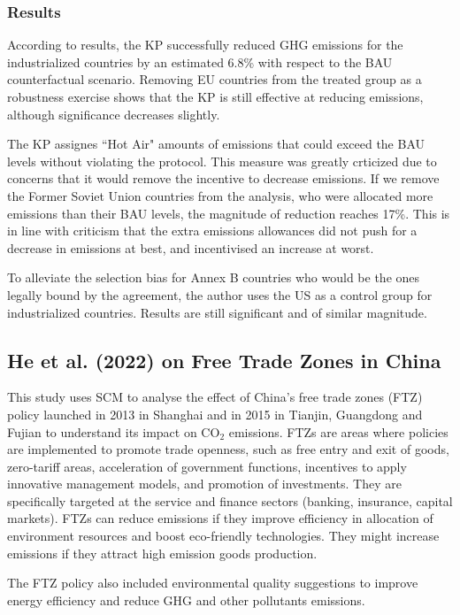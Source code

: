 \documentclass[12pt,a4paper,draft]{article}
\begin{document}
\subsubsection{Results}
According to results, the KP successfully reduced GHG emissions for the industrialized countries by 
an estimated 6.8\% with respect to the BAU counterfactual scenario. Removing EU countries from the 
treated group as a robustness exercise shows that the KP is still effective at reducing emissions, 
although significance decreases slightly.

The KP assignes ``Hot Air" amounts of emissions that could exceed the BAU levels without violating 
the protocol. This measure was greatly crticized due to concerns that it would remove the incentive 
to decrease emissions. If we remove the Former Soviet Union countries from the analysis, who were 
allocated more emissions than their BAU levels, the magnitude of reduction reaches 17\%. This is in 
line with criticism that the extra emissions allowances did not push for a decrease in emissions at 
best, and incentivised an increase at worst. 

To alleviate the selection bias for Annex B countries who would be the ones legally bound by the 
agreement, the author uses the US as a control group for industrialized countries. Results are still 
significant and of similar magnitude.


\subsection{He et al. (2022) on Free Trade Zones in China}
This study uses SCM to analyse the effect of China's free trade zones (FTZ) policy 
launched in 2013 in Shanghai and in 2015 in Tianjin, Guangdong and Fujian to 
understand its impact on CO$_2$ emissions. 
FTZs are areas where policies are implemented to promote trade openness, such as 
free entry and exit of goods, zero-tariff areas, acceleration of government functions, 
incentives to apply innovative management models, and promotion of investments. 
They are specifically targeted at the service and 
finance sectors (banking, insurance, capital markets). 
FTZs can reduce emissions if they improve efficiency in allocation 
of environment resources and boost eco-friendly technologies. They might increase 
emissions if they attract high emission goods production.

The FTZ policy also included environmental quality suggestions to improve energy 
efficiency and reduce GHG and other pollutants emissions. 
\end{document}
